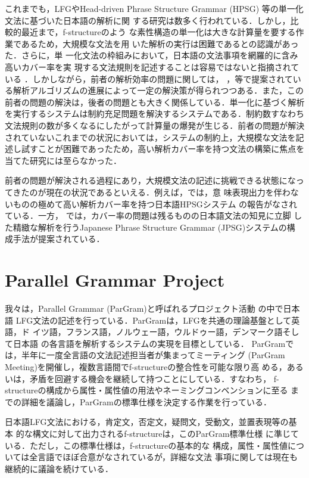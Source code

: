 これまでも，LFGやHead-driven Phrase Structure Grammar (HPSG)
\cite{PandS1987,PandS1994}等の単一化文法に基づいた日本語の解析に関
する研究は数多く行われている．しかし，比較的最近まで，f-structureのよう
な素性構造の単一化は大きな計算量を要する作業であるため，大規模な文法を用
いた解析の実行は困難であるとの認識があった\cite{hashida1997}．さらに，単
一化文法の枠組みにおいて，日本語の文法事項を網羅的に含み高いカバー率を実
現する文法規則を記述することは容易ではないと指摘されている
\cite{torisawa1999}．しかしながら，前者の解析効率の問題に関しては，
\cite{MandK1993}，\cite{NLE2000}等で提案されてい
る解析アルゴリズムの進展によって一定の解決策が得られつつある．また，この
前者の問題の解決は，後者の問題とも大きく関係している．単一化に基づく解析
を実行するシステムは制約充足問題を解決するシステムである．制約数すなわち
文法規則の数が多くなるにしたがって計算量の爆発が生じる．前者の問題が解決
されていないこれまでの状況においては，システムの制約上，大規模な文法を記
述し試すことが困難であったため，高い解析カバー率を持つ文法の構築に焦点を
当てた研究には至らなかった．

前者の問題が解決される過程にあり，大規模文法の記述に挑戦できる状態になっ
てきたのが現在の状況であるといえる．例えば，\cite{mitsuishi1998}では，意
味表現出力を伴わないものの極めて高い解析カバー率を持つ日本語HPSGシステム
の報告がなされている．一方，
\cite{otani2000} では，カバー率の問題は残るものの日本語文法の知見に立脚
した精緻な解析を行うJapanese Phrase Structure Grammar (JPSG)システムの構
成手法が提案されている．


\section{Parallel Grammar Project}
我々は，Parallel Grammar (ParGram)と呼ばれるプロジェクト活動
\cite{B1999b,B2002}の中で日本語
LFG文法の記述を行っている．ParGramは，LFGを共通の理論基盤として英語，ド
イツ語，フランス語，ノルウェー語，ウルドゥー語，デンマーク語そして日本語
の各言語を解析するシステムの実現を目標としている．
ParGramでは，半年に一度全言語の文法記述担当者が集まってミーティング
(ParGram Meeting)を開催し，複数言語間でf-structureの整合性を可能な限り高
める，あるいは，矛盾を回避する機会を継続して持つことにしている．すなわち，
f-structureの構成から属性・属性値の用法やネーミングコンベンションに至る
までの詳細を議論し，ParGramの標準仕様を決定する作業を行っている．

日本語LFG文法における，肯定文，否定文，疑問文，受動文，並置表現等の基本
的な構文に対して出力されるf-structureは，このParGram標準仕様
\cite{B1999a}に準じている．ただし，この標準仕様は，f-structureの基本的な
構成，属性・属性値については全言語でほぼ合意がなされているが，詳細な文法
事項に関しては現在も継続的に議論を続けている．

